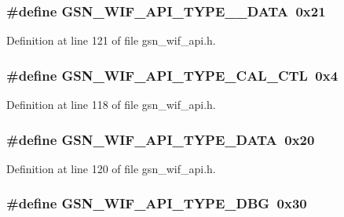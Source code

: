 \hypertarget{a00606_a6a88e175f21c3151d20d1e6d8d521243}{
\subsubsection[{GSN\_\-WIF\_\-API\_\-TYPE\_\-154\_\-DATA}]{\setlength{\rightskip}{0pt plus 5cm}\#define GSN\_\-WIF\_\-API\_\-TYPE\_\_\-DATA~0x21}}
\label{a00606_a6a88e175f21c3151d20d1e6d8d521243}


Definition at line 121 of file gsn\_\-wif\_\-api.h.

\hypertarget{a00606_ac93423f7f5f2de5551ddd87f5bbe304f}{
\subsubsection[{GSN\_\-WIF\_\-API\_\-TYPE\_\-CAL\_\-CTL}]{\setlength{\rightskip}{0pt plus 5cm}\#define GSN\_\-WIF\_\-API\_\-TYPE\_\-CAL\_\-CTL~0x4}}
\label{a00606_ac93423f7f5f2de5551ddd87f5bbe304f}


Definition at line 118 of file gsn\_\-wif\_\-api.h.

\hypertarget{a00606_a727f31d47220e310a75e7c1689ec6c43}{
\subsubsection[{GSN\_\-WIF\_\-API\_\-TYPE\_\-DATA}]{\setlength{\rightskip}{0pt plus 5cm}\#define GSN\_\-WIF\_\-API\_\-TYPE\_\-DATA~0x20}}
\label{a00606_a727f31d47220e310a75e7c1689ec6c43}


Definition at line 120 of file gsn\_\-wif\_\-api.h.

\hypertarget{a00606_ac32fa2de29fe87b7f1a6087a3243b8d4}{
\subsubsection[{GSN\_\-WIF\_\-API\_\-TYPE\_\-DBG}]{\setlength{\rightskip}{0pt plus 5cm}\#define GSN\_\-WIF\_\-API\_\-TYPE\_\-DBG~0x30}}
\label{a00606_ac32fa2de29fe87b7f1a6087a3243b8d4}


